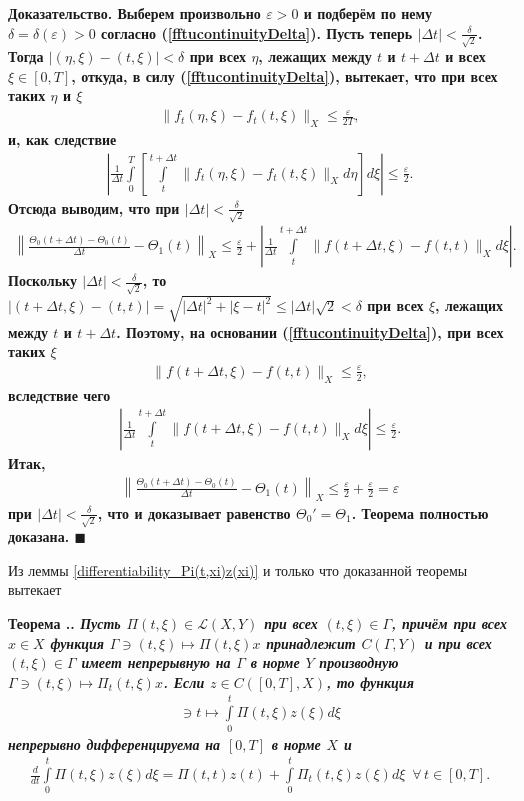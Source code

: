 \documentclass{report}
\newcounter{rem}[section]
\newcounter{theor}[section]
\renewcommand{\thetheor}{\thesection.\arabic{theor}}
\newenvironment{Theorem}{\par\refstepcounter{theor}\bf Теорема \thetheor. \it}{\rm\par}
\newenvironment{Proof}{\par\noindent\bf Доказательство.\rm}{ $\blacksquare$\par}
\begin{document}
\begin{Proof}
Выберем произвольно $\varepsilon>0$ и подберём по нему $\delta=\delta(\varepsilon)>0$ согласно (\ref{fftucontinuityDelta}). Пусть теперь $|\Delta t|<\frac\delta{\sqrt{2}}$. Тогда
$|(\eta,\xi)-(t,\xi)|<\delta$ при всех $\eta$, лежащих между $t$ и $t+\Delta t$ и всех $\xi\in[0,T]$, откуда, в силу (\ref{fftucontinuityDelta}), вытекает, что при всех таких $\eta$ и $\xi$
\begin{gather*}
\|f_t(\eta,\xi)-f_t(t,\xi)\|_X\leqslant\frac\varepsilon{2T},
\end{gather*}
и, как следствие
\begin{gather*}
\left|\frac1{\Delta t}\int\limits_0^{T}\left[\int\limits_t^{t+\Delta t}\|f_t(\eta,\xi)-f_t(t,\xi)\|_Xd\eta\right]d\xi\right|\leqslant\frac\varepsilon{2}.
\end{gather*}
Отсюда выводим, что при $|\Delta t|<\frac\delta{\sqrt{2}}$
\begin{gather*}
\left\|\frac{\Theta_0(t+\Delta t)-\Theta_0(t)}{\Delta t}-\Theta_1(t)\right\|_X\leqslant\frac\varepsilon{2}
+\left|\frac1{\Delta t}\int\limits_t^{t+\Delta t}\|f(t+\Delta t,\xi)-f(t,t)\|_Xd\xi\right|.
\end{gather*}
Поскольку $|\Delta t|<\frac\delta{\sqrt{2}}$, то $|(t+\Delta t,\xi)-(t,t)|=\sqrt{|\Delta t|^2+|\xi-t|^2}\leqslant|\Delta t|\sqrt2<\delta$
при всех $\xi$, лежащих между $t$ и $t+\Delta t$. Поэтому, на основании (\ref{fftucontinuityDelta}), при всех таких $\xi$
\begin{gather*}
\|f(t+\Delta t,\xi)-f(t,t)\|_X\leqslant\frac\varepsilon{2},
\end{gather*}
вследствие чего
\begin{gather*}
\left|\frac1{\Delta t}\int\limits_t^{t+\Delta t}\|f(t+\Delta t,\xi)-f(t,t)\|_Xd\xi\right|\leqslant\frac\varepsilon{2}.
\end{gather*}
Итак,
\begin{gather*}
\left\|\frac{\Theta_0(t+\Delta t)-\Theta_0(t)}{\Delta t}-\Theta_1(t)\right\|_X\leqslant\frac\varepsilon{2}+\frac\varepsilon{2}=\varepsilon
\end{gather*}
при $|\Delta t|<\frac\delta{\sqrt{2}}$, что и доказывает равенство $\Theta_0'=\Theta_1$. Теорема полностью доказана.
\end{Proof}

Из леммы \ref{differentiability_Pi(t,xi)z(xi)} и только что доказанной теоремы вытекает
\begin{Theorem}\label{parametric_integral_2}
Пусть $\Pi(t,\xi)\in\mathcal{L}(X,Y)$ при всех $(t,\xi)\in\Gamma$, причём при всех $x\in X$ функция $\Gamma\ni(t,\xi)\mapsto\Pi(t,\xi)x$ принадлежит $C(\Gamma,Y)$ и при всех
$(t,\xi)\in\Gamma$ имеет непрерывную на $\Gamma$ в норме $Y$ производную $\Gamma\ni(t,\xi)\mapsto\Pi_t(t,\xi)x$. Если $z\in C([0,T],X)$, то функция
\begin{gather*}
[0,T]\ni t\mapsto\int\limits_0^t\Pi(t,\xi)z(\xi)d\xi
\end{gather*}
непрерывно дифференцируема на $[0,T]$ в норме $X$ и
\begin{gather*}
\frac{d}{dt}\int\limits_0^t\Pi(t,\xi)z(\xi)d\xi=\Pi(t,t)z(t)+\int\limits_0^t\Pi_t(t,\xi)z(\xi)d\xi\,\,\,\forall\,t\in[0,T].
\end{gather*}
\end{Theorem}
\end{document}
